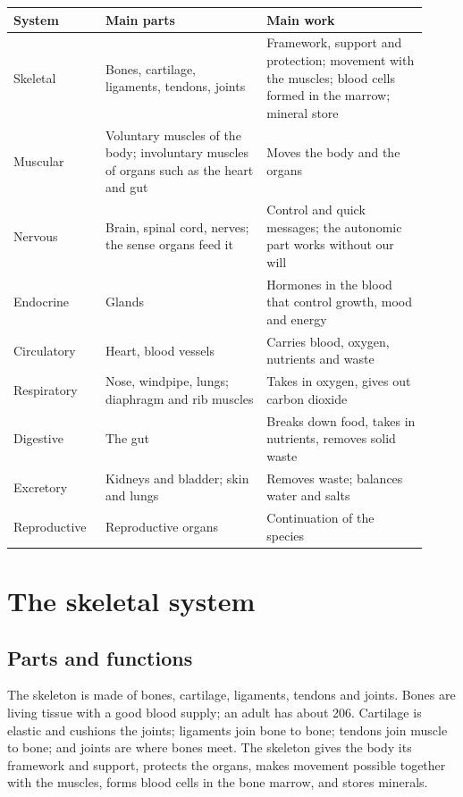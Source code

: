 \begin{table}[H]\centering\small
\begin{tabular}{@{}L{0.2\linewidth}L{0.36\linewidth}L{0.36\linewidth}@{}}
\toprule
\textbf{System} & \textbf{Main parts} & \textbf{Main work} \\
\midrule
Skeletal & Bones, cartilage, ligaments, tendons, joints & Framework, support and protection; movement with the muscles; blood cells formed in the marrow; mineral store \\
Muscular & Voluntary muscles of the body; involuntary muscles of organs such as the heart and gut & Moves the body and the organs \\
Nervous & Brain, spinal cord, nerves; the sense organs feed it & Control and quick messages; the autonomic part works without our will \\
Endocrine & Glands & Hormones in the blood that control growth, mood and energy \\
Circulatory & Heart, blood vessels & Carries blood, oxygen, nutrients and waste \\
Respiratory & Nose, windpipe, lungs; diaphragm and rib muscles & Takes in oxygen, gives out carbon dioxide \\
Digestive & The gut & Breaks down food, takes in nutrients, removes solid waste \\
Excretory & Kidneys and bladder; skin and lungs & Removes waste; balances water and salts \\
Reproductive & Reproductive organs & Continuation of the species \\
\bottomrule
\end{tabular}
\par{}
\end{table}

\section{The skeletal system}

\subsection*{Parts and functions}
The skeleton is made of bones, cartilage, ligaments, tendons and joints. Bones are living tissue with a good blood supply; an adult has about 206. Cartilage is elastic and cushions the joints; ligaments join bone to bone; tendons join muscle to bone; and joints are where bones meet. The skeleton gives the body its framework and support, protects the organs, makes movement possible together with the muscles, forms blood cells in the bone marrow, and stores minerals.

